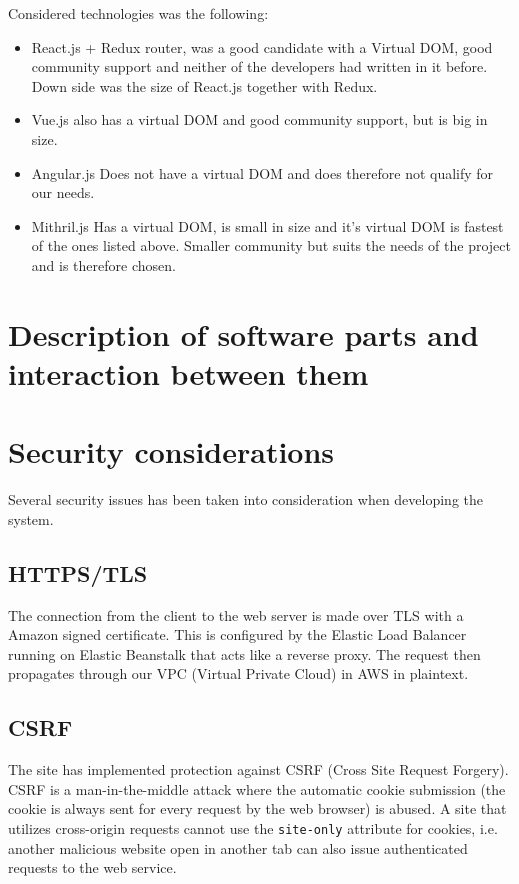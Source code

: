 \documentclass[12pt,a4paper]{report}
\begin{document}
Considered technologies was the following:
\begin{itemize}
    \item React.js + Redux router, was a good candidate with a Virtual DOM, good community support and neither of the developers had written in it before. Down side was the size of React.js together with Redux.
    \item Vue.js also has a virtual DOM and good community support, but is big in size.
    \item Angular.js Does not have a virtual DOM and does therefore not qualify for our needs.
    \item Mithril.js Has a virtual DOM, is small in size and it's virtual DOM is fastest of the ones listed above. Smaller community but suits the needs of the project and is therefore chosen.
\end{itemize}

\chapter{Description of software parts and interaction between them}

\newpage

\chapter{Security considerations}
Several security issues has been taken into consideration when developing the system.

\section{HTTPS/TLS}
The connection from the client to the web server is made over TLS with a Amazon signed certificate.
This is configured by the Elastic Load Balancer running on Elastic Beanstalk that acts like a reverse proxy.
The request then propagates through our VPC (Virtual Private Cloud) in AWS in plaintext. 

\section{CSRF}
\label{subsec:csrf}
The site has implemented protection against CSRF (Cross Site Request Forgery). CSRF is a man-in-the-middle attack where the automatic cookie submission (the cookie is always sent for every request by the web browser) is abused. A site that utilizes cross-origin requests cannot use the \texttt{site-only} attribute for cookies, i.e. another malicious website open in another tab can also issue authenticated requests to the web service\cite{rick}.
\end{document}
